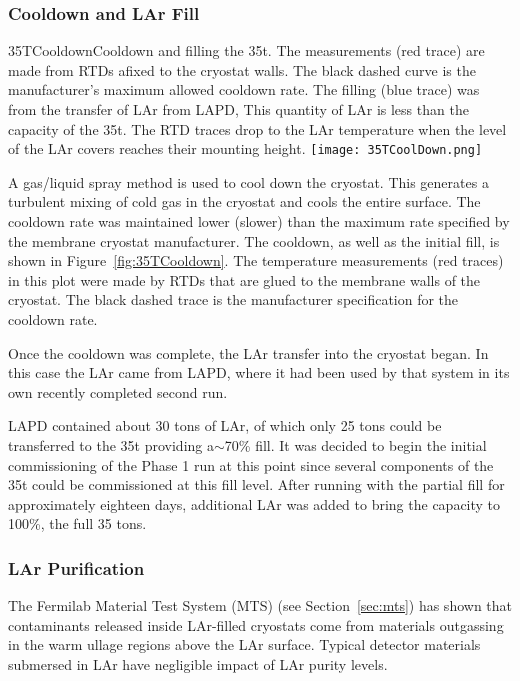\subsubsection {Cooldown and LAr Fill}

\begin{cdrfigure}{35TCooldown}{Cooldown and filling the 35t. The 
measurements (red trace) are made from RTDs afixed to the cryostat walls. The black dashed curve is the 
manufacturer's maximum allowed cooldown rate. The filling (blue trace) was from the transfer of LAr 
from LAPD, This quantity of LAr is less than the capacity of the 35t. The RTD traces drop to the LAr 
temperature when the level of the LAr covers reaches their mounting height.}
  \texttt{[image: 35TCoolDown.png]}
\end{cdrfigure}

A gas/liquid spray method is used to cool down the cryostat. This generates a turbulent mixing 
of cold gas in the cryostat and cools the entire surface. The cooldown rate was %
maintained lower (slower) than
the maximum rate specified by the membrane cryostat manufacturer. The cooldown, as well as the initial 
fill, is shown in Figure~\ref{fig:35TCooldown}. The temperature measurements (red traces) in this plot 
were made by RTDs that are glued to the membrane walls of the cryostat. The black dashed trace is the 
manufacturer specification for the cooldown rate.

Once the cooldown was complete, the LAr transfer into the cryostat began. %
In this case the LAr came from LAPD, where it had been used by that system in its own recently completed 
second run\cite{bib:lapdP07005}. 

LAPD contained about 30 tons of LAr, of which only 25 tons could be transferred to the 35t providing a$\sim$70\% fill. It was decided to begin the initial commissioning of the 
Phase 1 run at this point since several components of the 35t could be commissioned at this fill level. After running with the partial fill for approximately eighteen days, additional LAr was 
added to bring the capacity to 100\%, the full 35 tons.

\subsubsection{LAr Purification}

The Fermilab Material Test System (MTS)\cite{bib:Voiron9940,bib:mtslapd308} (see Section~\ref{sec:mts}) has shown that contaminants released inside LAr-filled cryostats come from materials outgassing in the warm ullage regions above the LAr surface. Typical detector materials submersed in LAr have negligible impact of LAr purity levels. 

